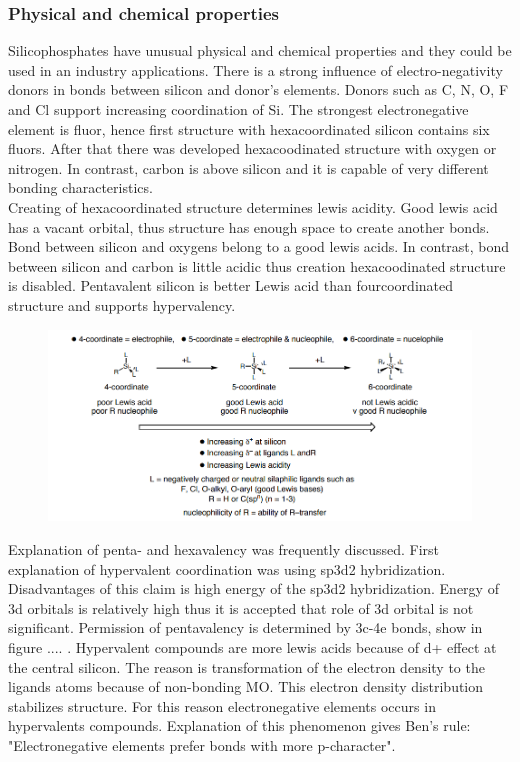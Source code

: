 \documentclass[
  digital, %
  table,   %
  lof,     %
  lot,     %
]{fithesis3}
\begin{document}
\subsubsection{Physical and chemical properties}
Silicophosphates have unusual physical and chemical properties and they could be used in an industry applications. There is a strong influence of electro-negativity donors in bonds between silicon and donor's elements.  Donors such as C, N, O, F and Cl support increasing coordination of Si. The strongest electronegative element is fluor, hence first structure with hexacoordinated silicon contains six fluors. After that there was developed hexacoodinated structure with oxygen or nitrogen. In contrast, carbon is above silicon and it is capable of very different bonding characteristics. \\
Creating of hexacoordinated structure determines lewis acidity. Good lewis acid has a vacant orbital, thus structure has enough space to create another bonds. Bond between silicon and oxygens belong to a good lewis acids. In contrast, bond between silicon and carbon is little acidic thus creation hexacoodinated structure is disabled. Pentavalent silicon is better Lewis acid than fourcoordinated structure and supports hypervalency.\cite{Wagler2014}\\

\begin{figure}[h!]
\caption{\cite{hypervalentsiliconmacmillangroup2005}}
  \center
  \includegraphics[width=12cm]{schema_silicophosphates.png}
  \label{schema_silicon_coordinate}
  \end{figure}


 Explanation of penta- and hexavalency was frequently discussed. First explanation of hypervalent coordination was using sp3d2 hybridization. Disadvantages of this claim is high energy of the sp3d2 hybridization. Energy of 3d orbitals is relatively high thus it is accepted that role of 3d orbital is not significant. Permission of pentavalency is determined by 3c-4e bonds, show in figure .... . Hypervalent compounds are more lewis acids because of d+ effect at the central silicon. The reason is transformation of the electron density to the ligands atoms because of non-bonding MO. This electron density distribution stabilizes structure. For this reason electronegative elements occurs in hypervalents compounds. Explanation of this phenomenon gives Ben's rule: "Electronegative elements prefer bonds with more p-character".\cite{hypervalentsiliconmacmillangroup2005} \\
\end{document}
